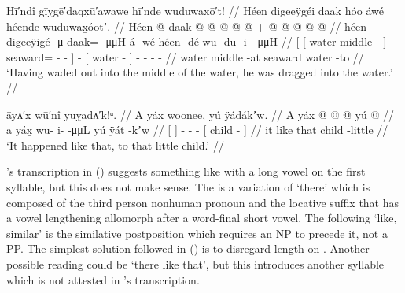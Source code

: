 \ex\label{ex:099-20-waded-out-dragged-in}%
%
\begingl
	\glpreamble	Hī′ndî gīỵgē′daqx̣ū′awawe hī′nde wuduwaxō′t! //
	\glpreamble	Héen digeeÿgéi daak hóo áwé héende wuduwax̱óotʼ. //
	\gla	{} {} Héen  @ {} {} daak @  @ {} @ {} @ {} {}
		 @ {} +
		{}  @ {} {}
		 @ {} @ {} @ {} @ {} //
	\glb	{} {} héen digeeÿigé -μ {} daak= {}  -μμH {} {}
		á -wé
		{} héen -dé {}
		wu- du- i-  -μμH //
	\glc	{}[ {}[ water middle - {}] seaward= -  - \· {}]
		 -
		{}[ water - {}]
		- - -  - //
	\gld	{} {} water middle -at {} seaward  {} {} {} {}
		 {}
		{} water -to {}
		 {} {} {} {} //
	\glft	‘Having waded out into the middle of the water, he was dragged into the water.’
		//
		
\endgl
\xe

\ex\label{ex:099-21-happened-like-that}%
%
\begingl
	\glpreamble	āyᴀ′x wū′nî yuỵadᴀ′k!ᵘ. //
	\glpreamble	A yáx̱ woonee, yú ÿádákʼw. //
	\gla	{} A yáx̱ {}  @ {} @ {} @ {}
		{} yú  @ {} {} //
	\glb	{} a yáx̱ {} wu- i-  -μμL
		{} yú ÿát -kʼw {} //
	\glc	{}[   {}] - -  -
		{}[  child - {}] //
	\gld	{} it like {}  {} {} {}
		{} that child -little {} //
	\glft	‘It happened like that, to that little child.’
		//
\endgl
\xe

\citeauthor{swanton:1909}’s transcription  in (\lastx) suggests something like  with a long vowel on the first syllable, but this does not make sense.
The  is a variation of  ‘there’ which is composed of the third person nonhuman pronoun  and the locative suffix  that has a vowel lengthening allomorph  after a word-final short vowel.
The following  ‘like, similar’ is the similative postposition which requires an NP to precede it, not a PP.
The simplest solution followed in (\lastx) is to disregard length on .
Another possible reading could be  ‘there like that’, but this introduces another syllable which is not attested in \citeauthor{swanton:1909}’s transcription.

